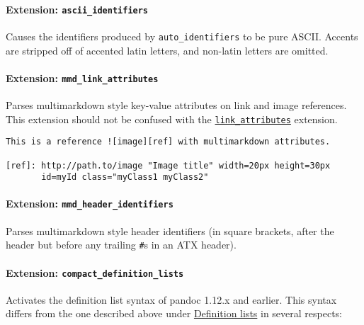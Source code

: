 \documentclass[]{article}
\let\oldparagraph\paragraph
\renewcommand{\paragraph}[1]{\oldparagraph{#1}\mbox{}}
\begin{document}
\paragraph{\texorpdfstring{Extension:
\texttt{ascii\_identifiers}}{Extension: ascii\_identifiers}}\label{extension-ascii_identifiers}

Causes the identifiers produced by \texttt{auto\_identifiers} to be pure
ASCII. Accents are stripped off of accented latin letters, and non-latin
letters are omitted.

\paragraph{\texorpdfstring{Extension:
\texttt{mmd\_link\_attributes}}{Extension: mmd\_link\_attributes}}\label{extension-mmd_link_attributes}

Parses multimarkdown style key-value attributes on link and image
references. This extension should not be confused with the
\protect\hyperlink{extension-link_attributes}{\texttt{link\_attributes}}
extension.

\begin{verbatim}
This is a reference ![image][ref] with multimarkdown attributes.

[ref]: http://path.to/image "Image title" width=20px height=30px
       id=myId class="myClass1 myClass2"
\end{verbatim}

\paragraph{\texorpdfstring{Extension:
\texttt{mmd\_header\_identifiers}}{Extension: mmd\_header\_identifiers}}\label{extension-mmd_header_identifiers}

Parses multimarkdown style header identifiers (in square brackets, after
the header but before any trailing \texttt{\#}s in an ATX header).

\paragraph{\texorpdfstring{Extension:
\texttt{compact\_definition\_lists}}{Extension: compact\_definition\_lists}}\label{extension-compact_definition_lists}

Activates the definition list syntax of pandoc 1.12.x and earlier. This
syntax differs from the one described above under
\protect\hyperlink{definition-lists}{Definition lists} in several
respects:
\end{document}
